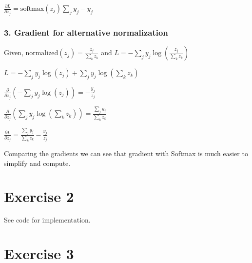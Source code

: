 \documentclass[11pt]{article}
\numberwithin{equation}{section}
\begin{document}
$\frac{\partial L}{\partial z_j} = \text{softmax}(z_j) \sum_j y_j - y_j$


\subsubsection*{3. Gradient for alternative normalization}

Given,
$\text{normalized}(z_j) = \frac{z_j}{\sum_k z_k}$
and 
$L = - \sum_j y_j \log\left(\frac{z_j}{\sum_k z_k}\right)$
\vspace{0.1cm}

$L = - \sum_j y_j \log(z_j) + \sum_j y_j \log\left(\sum_k z_k\right)$


$\frac{\partial}{\partial z_j} \left(- \sum_j y_j \log(z_j)\right) = -\frac{y_j}{z_j}$


$\frac{\partial}{\partial z_j} \left( \sum_j y_j \log\left(\sum_k z_k\right) \right) = \frac{\sum_j y_j}{\sum_k z_k}$


$\frac{\partial L}{\partial z_j} = \frac{\sum_j y_j}{\sum_k z_k} - \frac{y_j}{z_j}$

Comparing the gradients we can see that gradient with Softmax is much easier to simplify and compute. 

\section*{Exercise 2}
See code for implementation.

\section*{Exercise 3}
\end{document}
